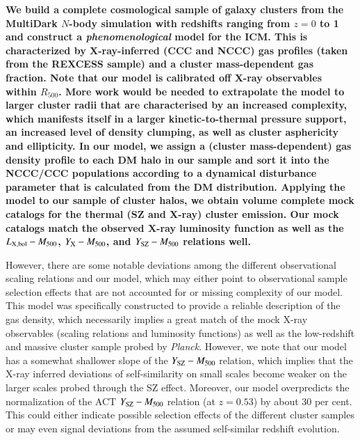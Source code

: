 \documentclass[useAMS,usenatbib]{mn2e}
\begin{document}
{\bf We build a complete cosmological sample of galaxy clusters from the
  MultiDark $N$-body simulation with redshifts ranging from $z = 0$ to 1 and
  construct a \emph{phenomenological} model for the ICM. This is characterized
  by X-ray-inferred (CCC and NCCC) gas profiles (taken from the REXCESS sample)
  and a cluster mass-dependent gas fraction. Note that our model is calibrated
  off X-ray observables within $R_{500}$. More work would be needed to
  extrapolate the model to larger cluster radii that are characterised by an
  increased complexity, which manifests itself in a larger kinetic-to-thermal
  pressure support, an increased level of density clumping, as well as cluster
  asphericity and ellipticity. In our model, we assign a (cluster
  mass-dependent) gas density profile to each DM halo in our sample and sort it
  into the NCCC/CCC populations according to a dynamical disturbance parameter
  that is calculated from the DM distribution. Applying the model to our sample
  of cluster halos, we obtain volume complete mock catalogs for the thermal (SZ
  and X-ray) cluster emission. Our mock catalogs match the observed X-ray
  luminosity function as well as the $L_{{\mathrm{X, bol}}}-M_{500}$,
  $Y_{{\mathrm{X}}}-M_{500}$, and $Y_{{\mathrm{SZ}}}-M_{500}$ relations well.

  However, there are some notable deviations among the different observational
  scaling relations and our model, which may either point to observational
  sample selection effects that are not accounted for or missing complexity of
  our model. This model was specifically constructed to provide a reliable
  description of the gas density, which necessarily implies a great match of the
  mock X-ray observables (scaling relations and luminosity functions) as well as
  the low-redshift and massive cluster sample probed by {\em Planck}. However,
  we note that our model has a somewhat shallower slope of the
  $Y_{{\mathrm{SZ}}}-M_{500}$ relation, which implies that the X-ray inferred
  deviations of self-similarity on small scales become weaker on the larger
  scales probed through the SZ effect. Moreover, our model overpredicts the
  normalization of the ACT $Y_{{\mathrm{SZ}}}-M_{500}$ relation (at $z=0.53$) by
  about 30 per cent. This could either indicate possible selection effects of
  the different cluster samples or may even signal deviations from the assumed
  self-similar redshift evolution.

}
\end{document}
